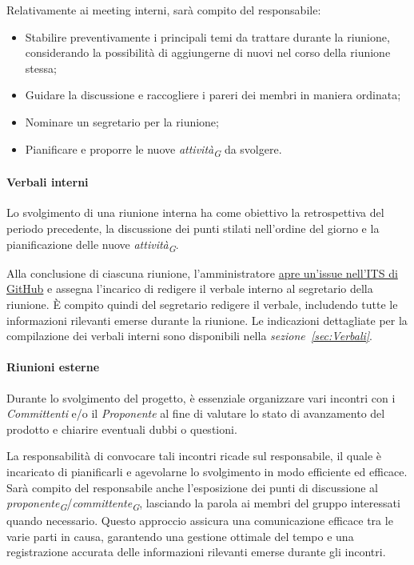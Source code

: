 \vspace{0,1cm}

Relativamente ai meeting interni, sarà compito del responsabile:
\begin{itemize}
		\item Stabilire preventivamente i principali temi da trattare durante la riunione, considerando la possibilità di aggiungerne di nuovi nel corso della riunione stessa;
		\item Guidare la discussione e raccogliere i pareri dei membri in maniera ordinata;
		\item Nominare un segretario per la riunione;
		\item Pianificare e proporre le nuove \textit{attività}\textsubscript{\textit{G}} da svolgere.
\end{itemize}

\hypertarget{par:verbaliInterni}{\paragraph*{Verbali interni}}
Lo svolgimento di una riunione interna ha come obiettivo la retrospettiva del periodo precedente, la discussione dei punti stilati nell'ordine del giorno e la pianificazione delle nuove \textit{attività}\textsubscript{\textit{G}}.

Alla conclusione di ciascuna riunione, l'amministratore \hyperlink{par:ticketing}{apre un'issue nell'ITS di GitHub} e assegna l'incarico di redigere il verbale interno al segretario della riunione. È compito quindi del segretario redigere il verbale, includendo tutte le informazioni rilevanti emerse durante la riunione. Le indicazioni dettagliate per la compilazione dei verbali interni sono disponibili nella \textit{sezione~\ref{sec:Verbali}}.

\paragraph{Riunioni esterne}
Durante lo svolgimento del progetto, è essenziale organizzare vari incontri con i \textit{Committenti} e/o il \textit{Proponente} al fine di valutare lo stato di avanzamento del prodotto e chiarire eventuali dubbi o questioni.

\vspace{0.2cm}

La responsabilità di convocare tali incontri ricade sul responsabile, il quale è incaricato di pianificarli e agevolarne lo svolgimento in modo efficiente ed efficace. \\
Sarà compito del responsabile anche l'esposizione dei punti di discussione al \textit{proponente}\textsubscript{\textit{G}}/\textit{committente}\textsubscript{\textit{G}}, lasciando la parola ai membri del gruppo interessati quando necessario. Questo approccio assicura una comunicazione efficace tra le varie parti in causa, garantendo una gestione ottimale del tempo e una registrazione accurata delle informazioni rilevanti emerse durante gli incontri.

